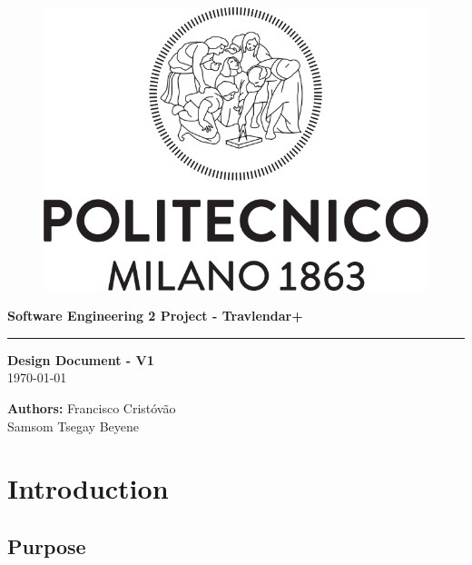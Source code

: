 \documentclass[12pt]{article}
\begin{document}
\begin{titlepage}
    \begin{center}
    \begin{figure}
        \centering
        \includegraphics[scale=0.2]{logoPolimi.png}
        \vspace{1.5cm}
    \end{figure}

    \Huge\textbf{Software Engineering 2 Project - Travlendar+}
    \rule{12cm}{0.5pt}
    \Huge\textbf{Design Document - V1}\\
    \today
    \end{center}
    
    \vspace{3cm}
    
    \begin{flushleft}
        \LARGE\textbf{Authors: }
        \newline\newline
        \Large\texttt{}{Francisco Cristóvão \\ Samsom Tsegay Beyene}
    \end{flushleft}



\end{titlepage}

\newpage
  \tableofcontents
\newpage

\section{Introduction}

\subsection{Purpose}
\end{document}
